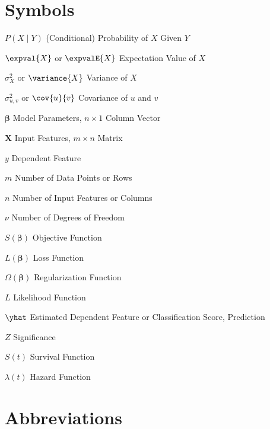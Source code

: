 \abbreviations

\section*{Symbols}

\begin{symbollist}
  \item[$P\left(X \mid Y\right)$] (Conditional) Probability of $X$ Given $Y$
  \item[$\expval{X}$ or $\expvalE{X}$] Expectation Value of $X$
  \item[$\sigma_{X}^{2}$ or $\variance{X}$] Variance of $X$
  \item[$\sigma_{u,v}^{2}$ or $\cov{u}{v}$] Covariance of $u$ and $v$
  \item[$\bm{\beta}$] Model Parameters, $n \times 1$ Column Vector
  \item[$\mathbf{X}$] Input Features, $m \times n$ Matrix
  \item[$y$] Dependent Feature
  \item[$m$] Number of Data Points or Rows
  \item[$n$] Number of Input Features or Columns
  \item[$\nu$] Number of Degrees of Freedom
  \item[$S\left(\bm{\beta}\right)$] Objective Function
  \item[$L\left(\bm{\beta}\right)$] Loss Function
  \item[$\Omega\left(\bm{\beta}\right)$] Regularization Function
  \item[$L$] Likelihood Function
  \item[$\yhat$] Estimated Dependent Feature or Classification Score, Prediction
  \item[$Z$] Significance
  \item[$S\left(t\right)$] Survival Function
  \item[$\lambda\left(t\right)$] Hazard Function
\end{symbollist}

\clearpage
\section*{Abbreviations}

